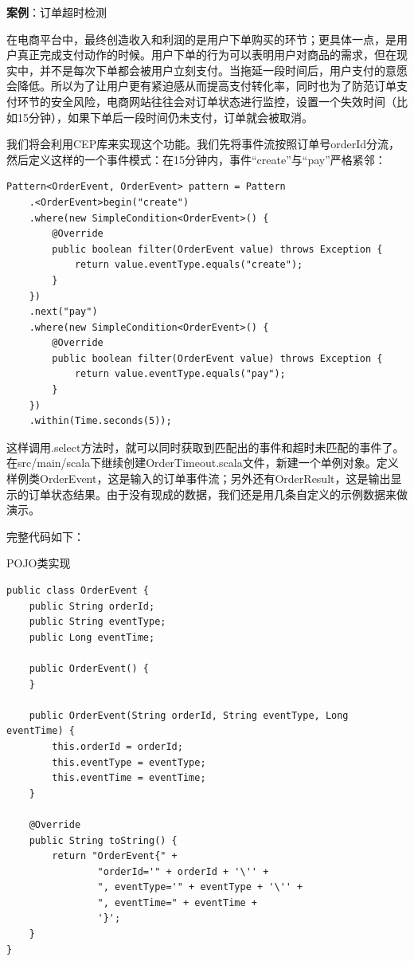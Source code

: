 \documentclass[cn,11pt,chinese]{elegantbook}
\begin{document}
\textbf{案例}：订单超时检测

在电商平台中，最终创造收入和利润的是用户下单购买的环节；更具体一点，是用户真正完成支付动作的时候。用户下单的行为可以表明用户对商品的需求，但在现实中，并不是每次下单都会被用户立刻支付。当拖延一段时间后，用户支付的意愿会降低。所以为了让用户更有紧迫感从而提高支付转化率，同时也为了防范订单支付环节的安全风险，电商网站往往会对订单状态进行监控，设置一个失效时间（比如15分钟），如果下单后一段时间仍未支付，订单就会被取消。

我们将会利用CEP库来实现这个功能。我们先将事件流按照订单号orderId分流，然后定义这样的一个事件模式：在15分钟内，事件“create”与“pay”严格紧邻：

\begin{verbatim}
Pattern<OrderEvent, OrderEvent> pattern = Pattern
    .<OrderEvent>begin("create")
    .where(new SimpleCondition<OrderEvent>() {
        @Override
        public boolean filter(OrderEvent value) throws Exception {
            return value.eventType.equals("create");
        }
    })
    .next("pay")
    .where(new SimpleCondition<OrderEvent>() {
        @Override
        public boolean filter(OrderEvent value) throws Exception {
            return value.eventType.equals("pay");
        }
    })
    .within(Time.seconds(5));
\end{verbatim}

这样调用.select方法时，就可以同时获取到匹配出的事件和超时未匹配的事件了。 在src/main/scala下继续创建OrderTimeout.scala文件，新建一个单例对象。定义样例类OrderEvent，这是输入的订单事件流；另外还有OrderResult，这是输出显示的订单状态结果。由于没有现成的数据，我们还是用几条自定义的示例数据来做演示。

完整代码如下：

POJO类实现

\begin{verbatim}
public class OrderEvent {
    public String orderId;
    public String eventType;
    public Long eventTime;

    public OrderEvent() {
    }

    public OrderEvent(String orderId, String eventType, Long eventTime) {
        this.orderId = orderId;
        this.eventType = eventType;
        this.eventTime = eventTime;
    }

    @Override
    public String toString() {
        return "OrderEvent{" +
                "orderId='" + orderId + '\'' +
                ", eventType='" + eventType + '\'' +
                ", eventTime=" + eventTime +
                '}';
    }
}
\end{verbatim}
\end{document}
